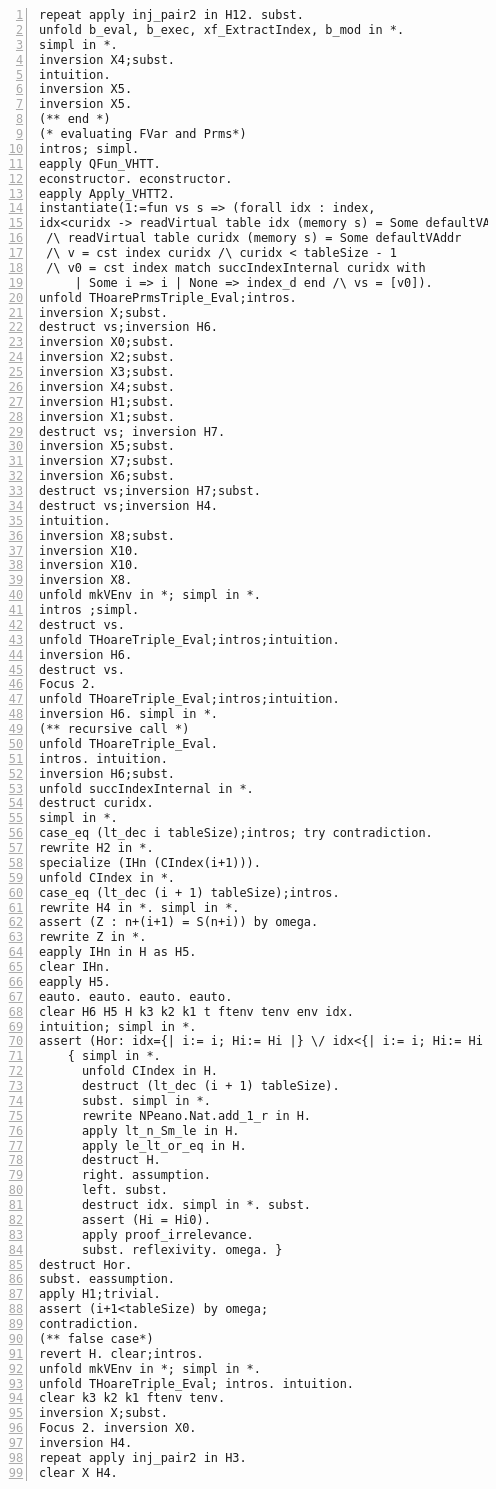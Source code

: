 \begin{appendices}
\begin{lstlisting}[xleftmargin=-.1\textwidth,
xrightmargin=-.1\textwidth,
mathescape=true,numbers=left]
repeat apply inj_pair2 in H12. subst.
unfold b_eval, b_exec, xf_ExtractIndex, b_mod in *.
simpl in *.
inversion X4;subst.
intuition.
inversion X5.
inversion X5.
(** end *)
(* evaluating FVar and Prms*)
intros; simpl.
eapply QFun_VHTT.
econstructor. econstructor.
eapply Apply_VHTT2.
instantiate(1:=fun vs s => (forall idx : index,
idx<curidx -> readVirtual table idx (memory s) = Some defaultVAddr) 
 /\ readVirtual table curidx (memory s) = Some defaultVAddr 
 /\ v = cst index curidx /\ curidx < tableSize - 1 
 /\ v0 = cst index match succIndexInternal curidx with
     | Some i => i | None => index_d end /\ vs = [v0]).
unfold THoarePrmsTriple_Eval;intros.
inversion X;subst.
destruct vs;inversion H6.
inversion X0;subst.
inversion X2;subst.
inversion X3;subst.
inversion X4;subst.
inversion H1;subst.
inversion X1;subst.
destruct vs; inversion H7.
inversion X5;subst.
inversion X7;subst.
inversion X6;subst.
destruct vs;inversion H7;subst.
destruct vs;inversion H4.
intuition.
inversion X8;subst.
inversion X10.
inversion X10.
inversion X8.
unfold mkVEnv in *; simpl in *.
intros ;simpl.
destruct vs.
unfold THoareTriple_Eval;intros;intuition.
inversion H6.
destruct vs.
Focus 2.
unfold THoareTriple_Eval;intros;intuition.
inversion H6. simpl in *.
(** recursive call *)
unfold THoareTriple_Eval.
intros. intuition.
inversion H6;subst.
unfold succIndexInternal in *.
destruct curidx.
simpl in *.
case_eq (lt_dec i tableSize);intros; try contradiction.
rewrite H2 in *.
specialize (IHn (CIndex(i+1))).
unfold CIndex in *.
case_eq (lt_dec (i + 1) tableSize);intros.
rewrite H4 in *. simpl in *.
assert (Z : n+(i+1) = S(n+i)) by omega.
rewrite Z in *.
eapply IHn in H as H5.
clear IHn.
eapply H5.
eauto. eauto. eauto. eauto.
clear H6 H5 H k3 k2 k1 t ftenv tenv env idx.
intuition; simpl in *.
assert (Hor: idx={| i:= i; Hi:= Hi |} \/ idx<{| i:= i; Hi:= Hi |}).
    { simpl in *.
      unfold CIndex in H.
      destruct (lt_dec (i + 1) tableSize).
      subst. simpl in *.
      rewrite NPeano.Nat.add_1_r in H.
      apply lt_n_Sm_le in H.
      apply le_lt_or_eq in H.
      destruct H.
      right. assumption.
      left. subst.
      destruct idx. simpl in *. subst. 
      assert (Hi = Hi0).
      apply proof_irrelevance.
      subst. reflexivity. omega. }
destruct Hor.
subst. eassumption.
apply H1;trivial.
assert (i+1<tableSize) by omega;
contradiction.
(** false case*)
revert H. clear;intros.
unfold mkVEnv in *; simpl in *.
unfold THoareTriple_Eval; intros. intuition.
clear k3 k2 k1 ftenv tenv.
inversion X;subst.
Focus 2. inversion X0.
inversion H4.
repeat apply inj_pair2 in H3.
clear X H4.

\end{lstlisting}
\end{appendices}
